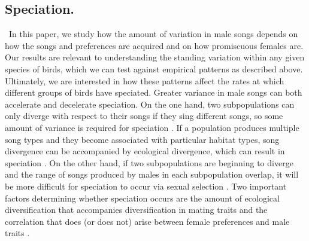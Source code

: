 \documentclass[12pt]{article}
\begin{document}
\subsection*{Speciation. } 
\ In this paper, we study how the amount of variation in male songs depends on how the songs and preferences are acquired and on how promiscuous females are. Our results are relevant to understanding the standing variation within any given species of birds, which we can test against empirical patterns as described above. Ultimately, we are interested in how these patterns affect the rates at which different groups of birds have speciated. Greater variance in male songs can both accelerate and decelerate speciation. On the one hand, two subpopulations can only diverge with respect to their songs if they sing different songs, so some amount of variance is required for speciation \cite{Mead:2004uq,Slabbekoorn:2002kl}. If a population produces multiple song types and they become associated with particular habitat types, song divergence can be accompanied by ecological divergence, which can result in speciation \cite{Slabbekoorn:2002kl,Doorn:2000nx}.
On the other hand, if two subpopulations are beginning to diverge and the range of songs produced by males in each subpopulation overlap, it will be more difficult for speciation to occur via sexual selection \cite{Verzijden:2012uq,Olofsson:2011kx,Kirkpatrick:2002fu,Irwin:1999fk}. Two important factors determining whether speciation occurs are the amount of ecological diversification that accompanies diversification in mating traits and the correlation that does (or does not) arise between female preferences and male traits \cite{Doorn:2000nx,Doebeli:2000oq,Verzijden:2012uq}.  
\end{document}
